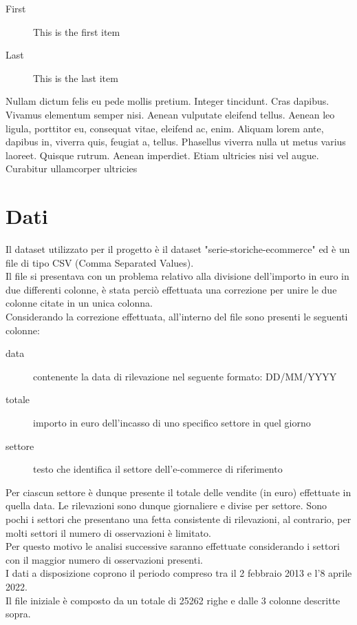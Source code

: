 \documentclass[12pt, a4paper, twocolumn]{article} %
\begin{document}
\begin{description}
	\item[First] This is the first item
	\item[Last] This is the last item
\end{description}
Nullam dictum felis eu pede mollis pretium. Integer tincidunt. Cras dapibus. Vivamus elementum semper nisi. Aenean vulputate eleifend tellus. Aenean leo ligula, porttitor eu, consequat vitae, eleifend ac, enim. Aliquam lorem ante, dapibus in, viverra quis, feugiat a, tellus. Phasellus viverra nulla ut metus varius laoreet. Quisque rutrum. Aenean imperdiet. Etiam ultricies nisi vel augue. Curabitur ullamcorper ultricies

\section{Dati}
Il dataset utilizzato per il progetto è il dataset "serie-storiche-ecommerce" ed è un file di tipo CSV (Comma Separated Values).\\
Il file si presentava con un problema relativo alla divisione dell'importo in euro in due differenti colonne, è stata perciò effettuata una correzione per unire le due colonne citate in un unica colonna.\\
Considerando la correzione effettuata, all'interno del file sono presenti le seguenti colonne:
\begin{description}
	\item[data] contenente la data di rilevazione nel seguente formato: DD/MM/YYYY
	\item[totale] importo in euro dell'incasso di uno specifico settore in quel giorno
	\item[settore] testo che identifica il settore dell'e-commerce di riferimento
\end{description}
Per ciascun settore è dunque presente il totale delle vendite (in euro) effettuate in quella data. Le rilevazioni sono dunque giornaliere e divise per settore. Sono pochi i settori che presentano una fetta consistente di rilevazioni, al contrario, per molti settori il numero di osservazioni è limitato.\\
Per questo motivo le analisi successive saranno effettuate considerando i settori con il maggior numero di osservazioni presenti.\\
I dati a disposizione coprono il periodo compreso tra il 2 febbraio 2013 e l'8 aprile 2022.\\
Il file iniziale è composto da un totale di 25262 righe e dalle 3 colonne descritte sopra.
\end{document}
